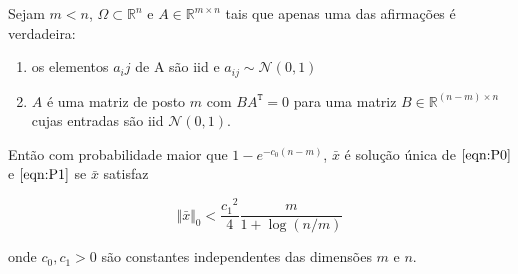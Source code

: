 \begin{teorema} \cite{zhang2008theory} Sejam $m < n$, $\Omega \subset \mathbb{R}^n$ e $A \in \mathbb{R}^{m \times n}$ tais que apenas uma das afirmações é verdadeira:
\begin{enumerate}
\item os elementos $a_ij$ de A são iid e $a_{ij} \sim \mathcal{N}(0,1)$
\item $A$ é uma matriz de posto $m$ com $BA^{\texttt{T}} = 0$ para uma matriz $B \in \mathbb{R}^{(n - m) \times n}$ cujas entradas são iid $\mathcal{N}(0,1)$.
\end{enumerate}
Então com probabilidade maior que $1 - e^{-c_0(n-m)}$, $\bar{x}$ é solução única de $\eqref{eqn:P0}$ e $\eqref{eqn:P1}$ se $\bar{x}$ satisfaz

$$ \Vert \bar{x} \Vert_0 < \frac{{c_1}^2}{4} \frac{m}{1 + \log(n/m)}$$

onde $c_0, c_1 > 0$ são constantes independentes das dimensões $m$ e $n$.
\label{thm:normalCS}
\end{teorema}